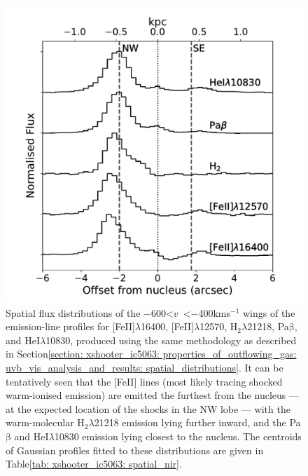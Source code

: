 \begin{figure}[!t]
    \centering
    \includegraphics[width=0.7\linewidth]{figures/xshooter_ic5063/spatial_nir.pdf}
    \caption[Spatial flux distributions of the {[}FeII{]}$\lambda$16400, {[}FeII{]}$\lambda$12570, H$_\mathrm{2}\lambda$21218, Pa$\mathrm{\beta}$, and HeI$\lambda$10830 emission lines for the outflows in IC.]{Spatial flux distributions of the \mbox{$-$600\;\textless\;$v$ \;\textless\;$-$400\;km\;s$^{-1}$} wings of the emission-line profiles for [FeII]$\lambda$16400, [FeII]$\lambda$12570, H$_\mathrm{2}\lambda$21218, Pa$\mathrm{\beta}$, and HeI$\lambda$10830, produced using the same methodology as described in Section\;\ref{section: xshooter_ic5063: properties_of_outflowing_gas: uvb_vis_analysis_and_results: spatial_distributions}. It can be tentatively seen that the [FeII] lines (most likely tracing shocked warm-ionised emission) are emitted the furthest from the nucleus --- at the expected location of the shocks in the NW lobe --- with the warm-molecular H$_\mathrm{2}\lambda$21218 emission lying further inward, and the Pa$\mathrm{\beta}$ and HeI$\lambda$10830 emission lying closest to the nucleus. The centroids of Gaussian profiles fitted to these distributions are given in Table\;\ref{tab: xshooter_ic5063: spatial_nir}.}
    \label{fig: xshooter_ic5063: spatial_nir}
\end{figure}

